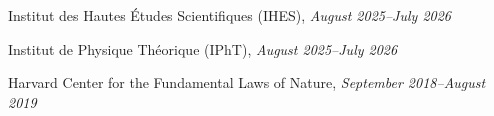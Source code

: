 \bbl
\item Institut des Hautes Études Scientifiques (IHES), \emph{August 2025--July 2026}
\item Institut de Physique Théorique (IPhT), \emph{August 2025--July 2026}
\item Harvard Center for the Fundamental Laws of Nature, \emph{September 2018--August 2019}
\el
